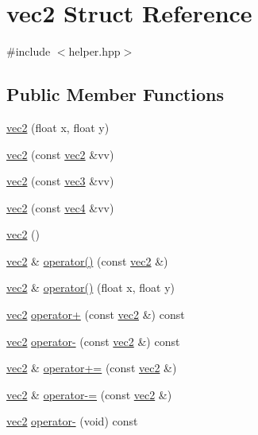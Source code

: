 \hypertarget{structvec2}{\section{vec2 Struct Reference}
\label{structvec2}
}


{\ttfamily \#include $<$helper.\+hpp$>$}

\subsection*{Public Member Functions}
\begin{DoxyCompactItemize}
\item 
\hyperlink{structvec2_a9486933da4d4d819a8b99bae91066cb3}{vec2} (float x, float y)
\item 
\hyperlink{structvec2_afc5a96fc403a9d8fd7e5d68bff5d29b7}{vec2} (const \hyperlink{structvec2}{vec2} \&vv)
\item 
\hyperlink{structvec2_ad91c5434ac0e8f28fbe003eb502794b4}{vec2} (const \hyperlink{structvec3}{vec3} \&vv)
\item 
\hyperlink{structvec2_a176b35e8578714444c9342c02e340d8f}{vec2} (const \hyperlink{structvec4}{vec4} \&vv)
\item 
\hyperlink{structvec2_ae12a1a221eca3561809600a11b58eaa3}{vec2} ()
\item 
\hyperlink{structvec2}{vec2} \& \hyperlink{structvec2_a7dbfc0907d75affde43a93268ffae3c6}{operator()} (const \hyperlink{structvec2}{vec2} \&)
\item 
\hyperlink{structvec2}{vec2} \& \hyperlink{structvec2_afd219b1a459e076b93f982eaed8d997c}{operator()} (float x, float y)
\item 
\hyperlink{structvec2}{vec2} \hyperlink{structvec2_af87b31cf8030bc55527b1107452ee5e9}{operator+} (const \hyperlink{structvec2}{vec2} \&) const 
\item 
\hyperlink{structvec2}{vec2} \hyperlink{structvec2_a68164358471bdcb3417869db193552bf}{operator-\/} (const \hyperlink{structvec2}{vec2} \&) const 
\item 
\hyperlink{structvec2}{vec2} \& \hyperlink{structvec2_a48fb5bd662a4d3ccd986747f20ea635d}{operator+=} (const \hyperlink{structvec2}{vec2} \&)
\item 
\hyperlink{structvec2}{vec2} \& \hyperlink{structvec2_adc2158607a6d462f8d1cc122fafdcced}{operator-\/=} (const \hyperlink{structvec2}{vec2} \&)
\item 
\hyperlink{structvec2}{vec2} \hyperlink{structvec2_a61720fc43c67b57ca581e96ee5a95cc8}{operator-\/} (void) const 

\end{DoxyCompactItemize}
